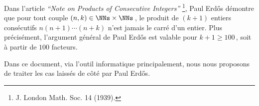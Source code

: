 Dans l'article \emph{\enquote{Note on Products of Consecutive Integers}}
\footnote{
	J. London Math. Soc. 14 (1939).
},
Paul Erdős démontre que pour tout couple $(n, k) \in \NNs \times \NNs$\,, le produit de $(k+1)$ entiers consécutifs $n (n + 1) \cdots (n + k)$ n'est jamais le carré d'un entier. 
Plus précisément, l'argument général de Paul Erdős est valable pour $k + 1 \geq 100$\,, soit à partir de $100$ facteurs.

\medskip

Dans ce document, via l'outil informatique principalement, nous nous proposons de traiter les cas laissés de côté par Paul Erdős.

